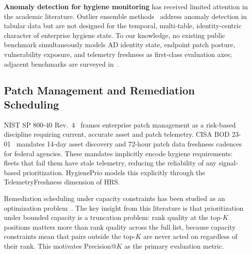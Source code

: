\textbf{Anomaly detection for hygiene monitoring} has received limited attention in the academic literature. Outlier ensemble methods~\cite{aggarwal2015outlier} address anomaly detection in tabular data but are not designed for the temporal, multi-table, identity-centric character of enterprise hygiene state. To our knowledge, no existing public benchmark simultaneously models AD identity state, endpoint patch posture, vulnerability exposure, and telemetry freshness as first-class evaluation axes; adjacent benchmarks are surveyed in~\cite{paper3hygienebench}.

\subsection{Patch Management and Remediation Scheduling}

NIST SP 800-40 Rev.~4~\cite{nist2022sp80040r4} frames enterprise patch management as a risk-based discipline requiring current, accurate asset and patch telemetry. CISA BOD 23-01~\cite{cisa2022bod2301} mandates 14-day asset discovery and 72-hour patch data freshness cadences for federal agencies. These mandates implicitly encode hygiene requirements: fleets that fail them have stale telemetry, reducing the reliability of any signal-based prioritization. HygienePrio models this explicitly through the TelemetryFreshness dimension of HRS.

Remediation scheduling under capacity constraints has been studied as an optimization problem~\cite{paper1vulnprio}. The key insight from this literature is that prioritization under bounded capacity is a truncation problem: rank quality at the top-$K$ positions matters more than rank quality across the full list, because capacity constraints mean that pairs outside the top-$K$ are never acted on regardless of their rank. This motivates Precision@$K$ as the primary evaluation metric.
